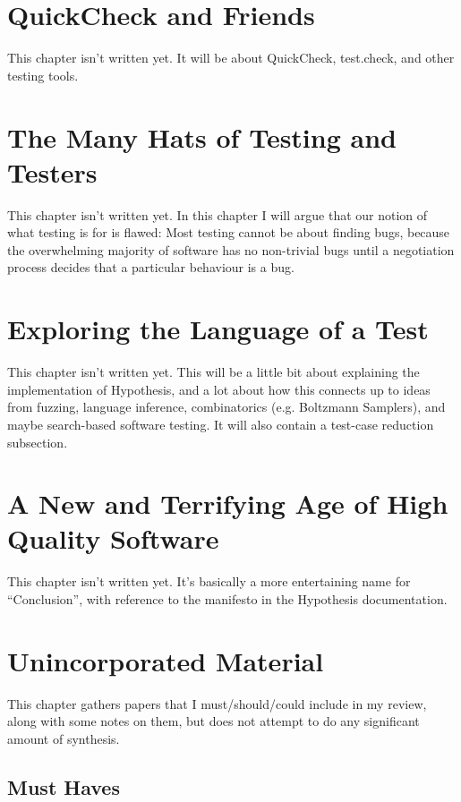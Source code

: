 \chapter{QuickCheck and Friends}\label{chap:quickcheck}

This chapter isn't written yet.
It will be about QuickCheck, test.check,
and other testing tools.

\chapter{The Many Hats of Testing and Testers}\label{chap:purposesoftesting}

This chapter isn't written yet.
In this chapter I will argue that our notion of what testing is for is flawed:
Most testing cannot be about finding bugs,
because the overwhelming majority of software has no non-trivial bugs until a negotiation process decides that a particular behaviour is a bug.

\chapter{Exploring the Language of a Test}\label{chap:testinglanguage}

This chapter isn't written yet.
This will be a little bit about explaining the implementation of Hypothesis,
and a lot about how this connects up to ideas from fuzzing, language inference, combinatorics (e.g. Boltzmann Samplers), and maybe search-based software testing.
It will also contain a test-case reduction subsection.

\chapter{A New and Terrifying Age of High Quality Software}\label{chap:conclusion}

This chapter isn't written yet.
It's basically a more entertaining name for ``Conclusion'',
with reference to the manifesto in the Hypothesis documentation.

\chapter{Unincorporated Material}

This chapter gathers papers that I must/should/could include in my review,
along with some notes on them,
but does not attempt to do any significant amount of synthesis.

\section{Must Haves}

